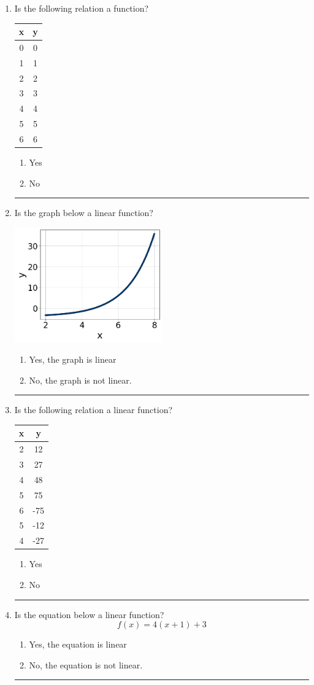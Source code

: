 \documentclass[14pt]{extbook}
\newcommand{\litem}[1]{\item#1\hspace*{-1cm}\rule{\textwidth}{0.4pt}}
\begin{document}
\begin{enumerate}
{\begin{enumerate}[label=\Alph*.]
\end{enumerate} }
\litem{
Is the following relation a function?

\begin{tabular}{c|c}
x &y\tabularnewline \hline
0 &0\tabularnewline \hline
1 &1\tabularnewline \hline
2 &2\tabularnewline \hline
3 &3\tabularnewline \hline
4 &4\tabularnewline \hline
5 &5\tabularnewline \hline
6 &6\end{tabular}\begin{enumerate}[label=\Alph*.]
\item Yes
\item No

\end{enumerate} }
\litem{
Is the graph below a linear function?
\begin{center}
    \includegraphics[width=0.5\textwidth]{../Figures/MA_8_F_1_2_graphB.png}
\end{center}
\begin{enumerate}[label=\Alph*.]
\item Yes, the graph is linear
\item No, the graph is not linear.

\end{enumerate} }
\litem{
Is the following relation a linear function?

\begin{tabular}{c|c}
x &y\tabularnewline \hline
2 &12\tabularnewline \hline
3 &27\tabularnewline \hline
4 &48\tabularnewline \hline
5 &75\tabularnewline \hline
6 &-75\tabularnewline \hline
5 &-12\tabularnewline \hline
4 &-27\end{tabular}\begin{enumerate}[label=\Alph*.]
\item Yes
\item No

\end{enumerate} }
\litem{
Is the equation below a linear function?\[ f(x) = 4(x + 1)+3 \]\begin{enumerate}[label=\Alph*.]
\item Yes, the equation is linear
\item No, the equation is not linear.


\end{enumerate}}
\end{enumerate}
\end{document}
